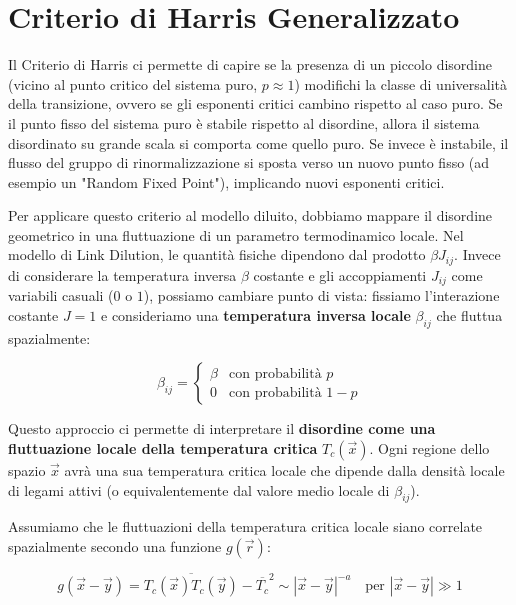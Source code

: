\section{Criterio di Harris Generalizzato}

Il Criterio di Harris ci permette di capire se la presenza di un piccolo disordine (vicino al punto critico del sistema puro, $p \approx 1$) modifichi la classe di universalità della transizione, ovvero se gli esponenti critici cambino rispetto al caso puro.
Se il punto fisso del sistema puro è stabile rispetto al disordine, allora il sistema disordinato su grande scala si comporta come quello puro. Se invece è instabile, il flusso del gruppo di rinormalizzazione si sposta verso un nuovo punto fisso (ad esempio un "Random Fixed Point"), implicando nuovi esponenti critici.

Per applicare questo criterio al modello diluito, dobbiamo mappare il disordine geometrico in una fluttuazione di un parametro termodinamico locale.
Nel modello di Link Dilution, le quantità fisiche dipendono dal prodotto $\beta J_{ij}$.
Invece di considerare la temperatura inversa $\beta$ costante e gli accoppiamenti $J_{ij}$ come variabili casuali ($0$ o $1$), possiamo cambiare punto di vista: fissiamo l'interazione costante $J=1$ e consideriamo una \textbf{temperatura inversa locale} $\beta_{ij}$ che fluttua spazialmente:

\begin{equation}
\beta_{ij} = 
\begin{cases} 
\beta & \text{con probabilità } p \\
0 & \text{con probabilità } 1-p 
\end{cases}
\end{equation}

Questo approccio ci permette di interpretare il \textbf{disordine come una fluttuazione locale della temperatura critica} $T_c(\vec{x})$. Ogni regione dello spazio $\vec{x}$ avrà una sua temperatura critica locale che dipende dalla densità locale di legami attivi (o equivalentemente dal valore medio locale di $\beta_{ij}$).

Assumiamo che le fluttuazioni della temperatura critica locale siano correlate spazialmente secondo una funzione $g(\vec{r})$:

\begin{equation}
g(\vec{x}-\vec{y}) = \overline{T_c(\vec{x}) T_c(\vec{y})} - \overline{T_c}^2 \sim |\vec{x}-\vec{y}|^{-a} \quad \text{per } |\vec{x}-\vec{y}| \gg 1
\end{equation}

